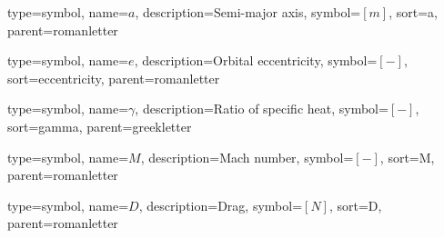 %

{
type=symbol, %
name={\ensuremath{a}}, %
description={Semi-major axis}, %
symbol={$\left[m\right]$}, %
sort=a, %
parent=romanletter %
}

{
type=symbol, %
name={\ensuremath{e}}, %
description={Orbital eccentricity}, %
symbol={$\left[-\right]$}, %
sort=eccentricity, %
parent=romanletter %
}

{
type=symbol, %
name={\ensuremath{\gamma}}, %
description={Ratio of specific heat}, %
symbol={$\left[-\right]$}, %
sort=gamma, %
parent=greekletter %
}

{
type=symbol, %
name={\ensuremath{M}}, %
description={Mach number}, %
symbol={$\left[-\right]$}, %
sort=M, %
parent=romanletter %
}

{
type=symbol, %
name={\ensuremath{D}}, %
description={Drag}, %
symbol={$\left[N\right]$}, %
sort=D, %
parent=romanletter %
}

